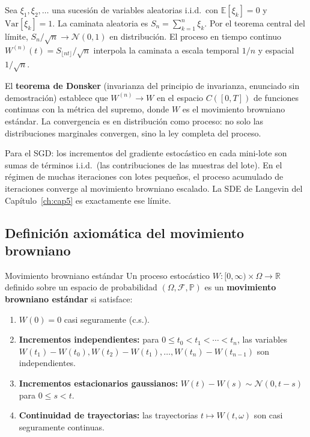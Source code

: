 Sea $\xi_1, \xi_2, \ldots$ una sucesión de variables aleatorias i.i.d.\ con
$\mathbb{E}[\xi_k] = 0$ y $\mathrm{Var}[\xi_k] = 1$. La caminata aleatoria
es $S_n = \sum_{k=1}^n \xi_k$. Por el teorema central del límite, $S_n/\sqrt{n}
\to \mathcal{N}(0,1)$ en distribución. El proceso en tiempo continuo
$W^{(n)}(t) = S_{\lfloor nt \rfloor}/\sqrt{n}$ interpola la caminata a
escala temporal $1/n$ y espacial $1/\sqrt{n}$.

El \textbf{teorema de Donsker} (invarianza del principio de invarianza,
enunciado sin demostración) establece que $W^{(n)} \to W$ en el espacio
$C([0,T])$ de funciones continuas con la métrica del supremo, donde $W$ es
el movimiento browniano estándar. La convergencia es en distribución como
proceso: no solo las distribuciones marginales convergen, sino la ley completa
del proceso.

Para el SGD: los incrementos del gradiente estocástico en cada mini-lote son
sumas de términos i.i.d.\ (las contribuciones de las muestras del lote). En el
régimen de muchas iteraciones con lotes pequeños, el proceso acumulado de
iteraciones converge al movimiento browniano escalado. La SDE de Langevin del
Capítulo~\ref{ch:cap5} es exactamente ese límite.

\subsection{Definición axiomática del movimiento browniano}
\label{subsec:browniano_def}

\begin{definicion}{Movimiento browniano estándar}
\label{def:browniano}
Un proceso estocástico $W: [0,\infty) \times \Omega \to \mathbb{R}$ definido
sobre un espacio de probabilidad $(\Omega, \mathcal{F}, \mathbb{P})$ es un
\textbf{movimiento browniano estándar} si satisface:
\begin{enumerate}
  \item $W(0) = 0$ casi seguramente (c.s.).
  \item \textbf{Incrementos independientes:} para $0 \leq t_0 < t_1 < \cdots
        < t_n$, las variables $W(t_1)-W(t_0), W(t_2)-W(t_1),\ldots,
        W(t_n)-W(t_{n-1})$ son independientes.
  \item \textbf{Incrementos estacionarios gaussianos:}
        $W(t)-W(s) \sim \mathcal{N}(0,t-s)$ para $0 \leq s < t$.
  \item \textbf{Continuidad de trayectorias:} las trayectorias $t \mapsto W(t,\omega)$
        son casi seguramente continuas.
\end{enumerate}
\end{definicion}

